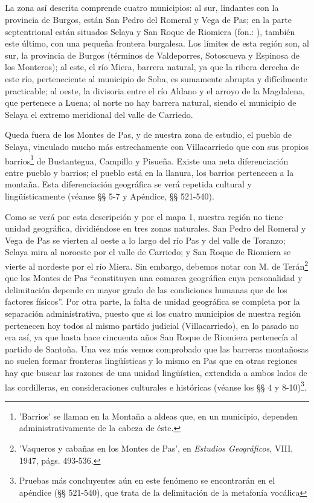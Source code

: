 \subsection{} La zona así descrita comprende cuatro municipios: al sur, lindantes con la provincia de Burgos, están San Pedro del Romeral y Vega de Pas; en la parte septentrional están situados Selaya y San Roque de Riomiera (fon.: ), también este último, con una pequeña frontera burgalesa. Los límites de esta región son, al sur, la provincia de Burgos (términos de Valdeporres, Sotoscueva y Espinosa de los Monteros); al este, el río Miera, barrera natural, ya que la ribera derecha de este río, perteneciente al municipio de Soba, es sumamente abrupta y difícilmente practicable; al oeste, la divisoria entre el río Aldano y el arroyo de la Magdalena, que pertenece a Luena; al norte no hay barrera natural, siendo el municipio de Selaya el extremo meridional del valle de Carriedo. 

Queda fuera de los Montes de Pas, y de nuestra zona de estudio, el pueblo de Selaya, vinculado mucho más estrechamente con Villacarriedo que con sus propios barrios\footnote{'Barrios' se llaman en la Montaña a aldeas que, en un municipio, dependen administrativamente de la cabeza de éste.} de Bustantegua, Campillo y Pisueña. Existe una neta diferenciación entre pueblo y barrios; el pueblo está en la llanura, los barrios pertenecen a la montaña. Esta diferenciación geográfica se verá repetida cultural y lingüísticamente (véanse §§ 5-7 y Apéndice, §§ 521-540). 

Como se verá por esta descripción y por el mapa 1, nuestra región no tiene unidad geográfica, dividiéndose en tres zonas naturales. San Pedro del Romeral y Vega de Pas se vierten al oeste a lo largo del río Pas y del valle de Toranzo; Selaya mira al noroeste por el valle de Carriedo; y San Roque de Riomiera se vierte al nordeste por el río Miera. Sin embargo, debemos notar con M. de Terán\footnote{'Vaqueros y cabañas en los Montes de Pas', en \emph{Estudios Geográficos}, VIII, 1947, págs. 493-536.} que los Montes de Pas ``constituyen una comarca geográfica cuya personalidad y delimitación depende en mayor grado de las condiciones humanas que de los factores físicos''. Por otra parte, la falta de unidad geográfica se completa por la separación administrativa, puesto que si los cuatro municipios de nuestra región pertenecen hoy todos al mismo partido judicial (Villacarriedo), en lo pasado no era así, ya que hasta hace cincuenta años San Roque de Riomiera pertenecía al partido de Santoña. Una vez más vemos comprobado que las barreras montañosas no suelen formar fronteras lingüísticas y lo mismo en Pas que en otras regiones hay que buscar las razones de una unidad lingüística, extendida a ambos lados de las cordilleras, en consideraciones culturales e históricas (véanse los §§ 4 y 8-10)\footnote{Pruebas más concluyentes aún en este fenómeno se encontrarán en el apéndice (§§ 521-540), que trata de la delimitación de la metafonía vocálica}.


